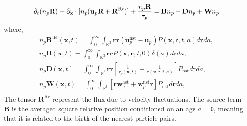 \begin{equation*}
    \partial_t (n_p\textbf{R})
    + \partial_\textbf{x} \cdot [n_p(\textbf{u}_p\textbf{R}
    + \textbf{R}^\text{Re})]
    + \frac{n_p\textbf{R}}{\tau_p}
    = 
    \textbf{B} n_p
    + \textbf{D}n_p 
    + \textbf{W}n_p
    \label{eq:dt_R}
\end{equation*}
where,
\begin{align*}
    n_p \textbf{R}^\text{Re}(\textbf{x},t)
    =
    \int_{0}^\infty
    \int_{\mathbb{R}^3}
    \textbf{rr}(\textbf{u}^\text{nst}_p - \textbf{u}_p)
    P(\textbf{x},\textbf{r},t,a)
    d\textbf{r}da,\\
    n_p \textbf{B}(\textbf{x},t)
    =
    \int_{0}^\infty
    \int_{\mathbb{R}^3}
    \textbf{rr}
    P(\textbf{x},\textbf{r},t,0)\delta(a)
    d\textbf{r}da, \\
    n_p\textbf{D}(\textbf{x},t) = 
    \int_{0}^\infty
    \int_{\mathbb{R}^3} \textbf{rr}
    \left[
        \frac{1}{\tau_p(\textbf{x},t)}
        - \frac{1}{\tau(\textbf{x},\textbf{r},t,a)}
    \right]
    P_\text{nst}
    d\textbf{r}
    da,\\
    n_p \textbf{W}(\textbf{x},t) = 
    \int_{0}^\infty
    \int_{\mathbb{R}^3} \left[
        \textbf{r} \textbf{w}^\text{nst}_p
        + \textbf{w}^\text{nst}_p\textbf{r}
    \right]P_\text{nst}
    d\textbf{r}
    da,\\
\end{align*} 
The tensor $\textbf{R}^\text{Re}$ represent the flux due to velocity fluctuations. 
The source term $\textbf{B}$ is the averaged square relative position conditioned on an age $a=0$, meaning that it is related to the birth of the nearest particle pairs. 

